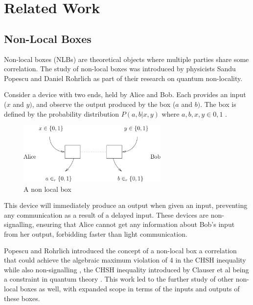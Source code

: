 \documentclass[report.tex]{subfiles}
\begin{document}
\chapter{Related Work} %
\label{cha:related_work}


\section{Non-Local Boxes} %
\label{sec:non_local_boxes}
Non-local boxes (NLBs) are theoretical objects where multiple parties share some
correlation. The study of non-local boxes was introduced by physicists Sandu
Popescu and Daniel Rohrlich as part of their research on quantum non-locality.

Consider a device with two ends, held by Alice and Bob. Each provides an
input (\(x\) and \(y)\), and observe the output produced by the box (\(a\) and
\(b)\). The box is defined by the probability distribution \(P(a,b | x,y)\) 
where \(a, b, x, y \in {0, 1}\) \cite{nlb_lamontagne}. 

\begin{figure}[H]
  \centering
  \includegraphics[width=0.66\textwidth]{img/nlb}
  \caption{A non local box \cite[Section~I]{2006quant.ph..9166D}}
\end{figure}

This device will immediately produce an output when given an input, preventing
any communication as a result of a delayed input. These devices are
non-signalling, ensuring that Alice cannot get any information about Bob's input
from her output, forbidding faster than light communication.

Popescu and Rohrlich introduced the concept of a non-local box a correlation 
that could achieve the algebraic maximum violation of 4 in the CHSH inequality
while also non-signalling \cite{ref1}, the CHSH inequality introduced by Clauser
et al being a constraint in quantum theory \cite{PhysRevLett.23.880}. This work
led to the further study of other non-local boxes as well, with expanded scope
in terms of the inputs and outputs of these boxes.
\end{document}
